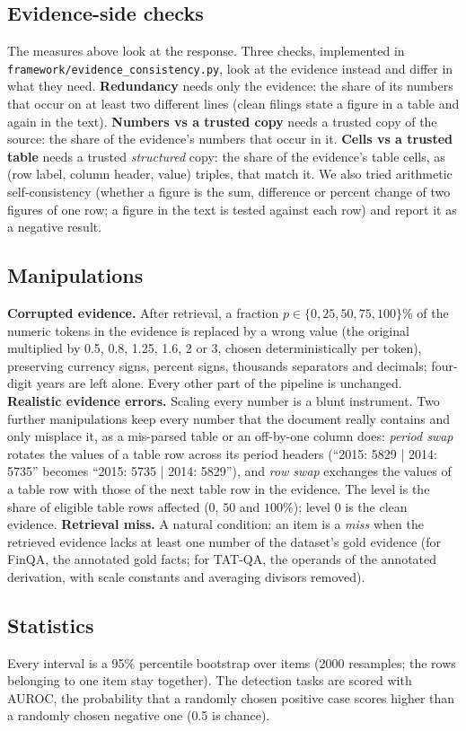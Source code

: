 \subsection{Evidence-side checks}
\label{sec:evidence-checks}
The measures above look at the response. Three checks, implemented in \texttt{framework/evidence\_consistency.py}, look at the evidence instead and differ in what they need.
\textbf{Redundancy} needs only the evidence: the share of its numbers that occur on at least two different lines (clean filings state a figure in a table and again in the text).
\textbf{Numbers vs a trusted copy} needs a trusted copy of the source: the share of the evidence's numbers that occur in it.
\textbf{Cells vs a trusted table} needs a trusted \emph{structured} copy: the share of the evidence's table cells, as (row label, column header, value) triples, that match it.
We also tried arithmetic self-consistency (whether a figure is the sum, difference or percent change of two figures of one row; a figure in the text is tested against each row) and report it as a negative result.

\subsection{Manipulations}
\textbf{Corrupted evidence.} After retrieval, a fraction $p\in\{0,25,50,75,100\}\%$ of the numeric tokens in the evidence is replaced by a wrong value (the original multiplied by 0.5, 0.8, 1.25, 1.6, 2 or 3, chosen deterministically per token), preserving currency signs, percent signs, thousands separators and decimals; four-digit years are left alone.
Every other part of the pipeline is unchanged.
\textbf{Realistic evidence errors.} Scaling every number is a blunt instrument. Two further manipulations keep every number that the document really contains and only misplace it, as a mis-parsed table or an off-by-one column does: \emph{period swap} rotates the values of a table row across its period headers (``2015: 5829 | 2014: 5735'' becomes ``2015: 5735 | 2014: 5829''), and \emph{row swap} exchanges the values of a table row with those of the next table row in the evidence. The level is the share of eligible table rows affected ($0$, $50$ and $100\%$); level $0$ is the clean evidence.
\textbf{Retrieval miss.} A natural condition: an item is a \emph{miss} when the retrieved evidence lacks at least one number of the dataset's gold evidence (for FinQA, the annotated gold facts; for TAT-QA, the operands of the annotated derivation, with scale constants and averaging divisors removed).

\subsection{Statistics}
Every interval is a 95\% percentile bootstrap over items (2000 resamples; the rows belonging to one item stay together).
The detection tasks are scored with AUROC, the probability that a randomly chosen positive case scores higher than a randomly chosen negative one (0.5 is chance).
